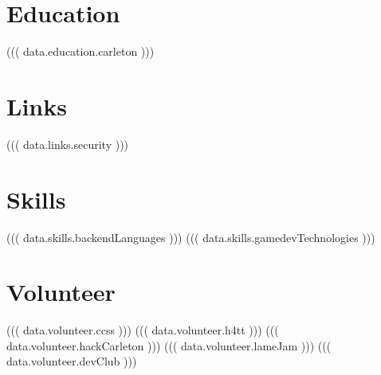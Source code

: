 \documentclass[]{deedy-resume-openfont}
\begin{document}
\vspace*{10pt}


%
%

\begin{minipage}[t]{0.33\textwidth}

\section{Education}

((( data.education.carleton )))

\section{Links}

((( data.links.security )))

\section{Skills}

((( data.skills.backendLanguages )))
((( data.skills.gamedevTechnologies )))

\section{Volunteer}

((( data.volunteer.ccss )))
((( data.volunteer.h4tt )))
((( data.volunteer.hackCarleton )))
((( data.volunteer.lameJam )))
((( data.volunteer.devClub )))

%
%

\end{minipage} 
\hfill
\end{document}
